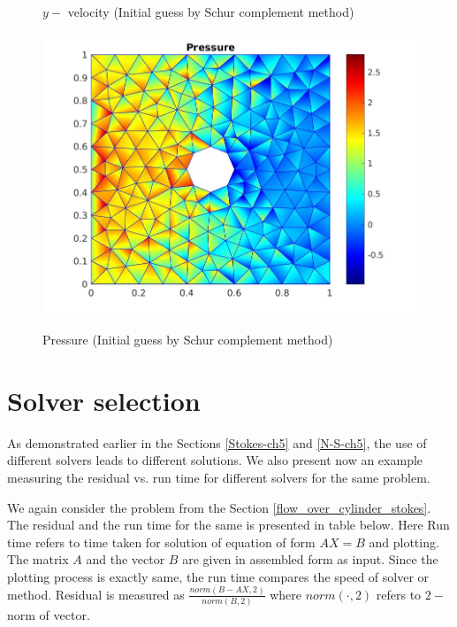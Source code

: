 \documentclass[a4paper]{book}
\begin{document}
\begin{figure}
\begin{minipage}[c]{0.3\textwidth}
    \caption{$y-$ velocity (Initial guess by Schur complement method)}
  \label{y_vel_navier_stoke_schur}
  \end{minipage}
  \begin{minipage}[c]{0.67\textwidth}
    \includegraphics[width=\textwidth]{cylinder_newton_pressure_schur.jpg}
  \end{minipage}\hfill
  \begin{minipage}[c]{0.3\textwidth}
    \caption{Pressure (Initial guess by Schur complement method)}
  \label{pressure_navier_stoke_schur}
  \end{minipage}
\caption{\label{flow_over_cylinder_schur_n_s}}
\end{figure}

\section{Solver selection}

As demonstrated earlier in the Sections \ref{Stokes-ch5} and \ref{N-S-ch5}, the use of different solvers leads to different solutions. We also present now an example measuring the residual vs. run time for different solvers for the same problem.

We again consider the problem from the Section \ref{flow_over_cylinder_stokes}. The residual and the run time for the same is presented in table below.
Here Run time refers to time taken for solution of equation of form $AX = B$ and plotting.  The matrix $A$ and the vector $B$ are given in assembled form as input. Since the plotting process is exactly same, the run time compares the speed of solver or method. Residual is measured as $\frac{norm(B-AX,2)}{norm(B,2)}$ where $norm(\cdot,2)$ refers to $2-$norm of vector.
\end{document}
